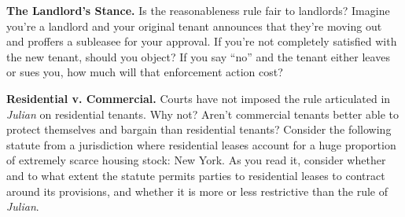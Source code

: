 \item \textbf{The Landlord's Stance.} Is the reasonableness rule fair
to landlords?  Imagine you're a landlord and your original tenant announces
that they're moving out and proffers a subleasee for your approval.  If you're
not completely satisfied with the new tenant, should you object?  If you say
``no'' and the tenant either leaves or sues you, how much will that enforcement
action cost?  


\item \textbf{Residential v. Commercial.} Courts have not imposed the
rule articulated in \textit{Julian} on residential tenants.  Why not? Aren't
commercial tenants better able to protect themselves and bargain than
residential tenants? Consider the following statute from a jurisdiction where
residential leases account for a huge proportion of extremely scarce housing
stock: New York. As you read it, consider whether and to what extent the
statute permits parties to residential leases to contract around its
provisions, and whether it is more or less restrictive than the rule of
\textit{Julian}.

